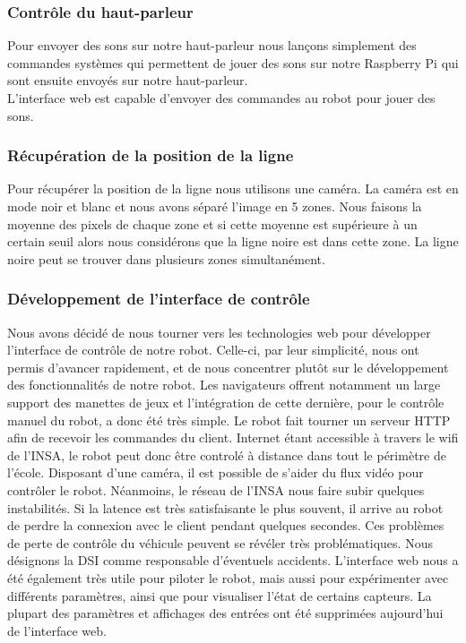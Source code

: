 \subsubsection*{Contrôle du haut-parleur}

Pour envoyer des sons sur notre haut-parleur nous lançons simplement des commandes systèmes qui permettent de jouer des sons sur notre Raspberry Pi qui sont ensuite envoyés sur notre haut-parleur.
\\
L'interface web est capable d'envoyer des commandes au robot pour jouer des sons.

\subsubsection*{Récupération de la position de la ligne}
Pour récupérer la position de la ligne nous utilisons une caméra. La caméra est en mode noir et blanc et nous avons séparé l'image en 5 zones.
Nous faisons la moyenne des pixels de chaque zone et si cette moyenne est supérieure à un certain seuil alors nous considérons que la ligne noire est dans cette zone. La ligne noire peut se trouver dans plusieurs zones simultanément.



\subsubsection{Développement de l'interface de contrôle}
Nous avons décidé de nous tourner vers les technologies web pour développer l'interface de contrôle de notre robot. Celle-ci, par leur simplicité, nous ont permis d'avancer rapidement, et de nous concentrer plutôt sur le développement des fonctionnalités de notre robot. Les navigateurs offrent notamment un large support des manettes de jeux et l'intégration de cette dernière, pour le contrôle manuel du robot, a donc été très simple.
Le robot fait tourner un serveur HTTP afin de recevoir les commandes du client. Internet étant accessible à travers le wifi de l'INSA, le robot peut donc être controlé à distance dans tout le périmètre de l'école. Disposant d'une caméra, il est possible de s'aider du flux vidéo pour contrôler le robot.
Néanmoins, le réseau de l'INSA nous faire subir quelques instabilités. Si la latence est très satisfaisante le plus souvent, il arrive au robot de perdre la connexion avec le client pendant quelques secondes. Ces problèmes de perte de contrôle du véhicule peuvent se révéler très problématiques. Nous désignons la DSI comme responsable d'éventuels accidents.
L'interface web nous a été également très utile pour piloter le robot, mais aussi pour expérimenter avec différents paramètres, ainsi que pour visualiser l'état de certains capteurs. La plupart des paramètres et affichages des entrées ont été supprimées aujourd'hui de l'interface web.

